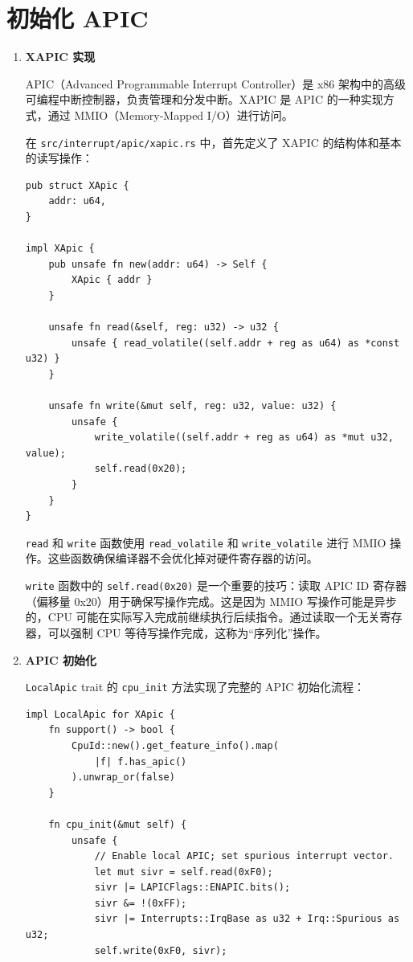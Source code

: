 \documentclass{SYSUReport}
\begin{document}
\section{初始化 APIC}

\begin{enumerate}[label={\chinese*、},labelsep=0pt, start=4]

    \item \textbf{XAPIC 实现}

    APIC（Advanced Programmable Interrupt Controller）是 x86 架构中的高级可编程中断控制器，负责管理和分发中断。XAPIC 是 APIC 的一种实现方式，通过 MMIO（Memory-Mapped I/O）进行访问。

    在 \texttt{src/interrupt/apic/xapic.rs} 中，首先定义了 XAPIC 的结构体和基本的读写操作：

    \begin{verbatim}
pub struct XApic {
    addr: u64,
}

impl XApic {
    pub unsafe fn new(addr: u64) -> Self {
        XApic { addr }
    }

    unsafe fn read(&self, reg: u32) -> u32 {
        unsafe { read_volatile((self.addr + reg as u64) as *const u32) }
    }

    unsafe fn write(&mut self, reg: u32, value: u32) {
        unsafe {
            write_volatile((self.addr + reg as u64) as *mut u32, value);
            self.read(0x20);
        }
    }
}
    \end{verbatim}

    \texttt{read} 和 \texttt{write} 函数使用 \texttt{read\_volatile} 和 \texttt{write\_volatile} 进行 MMIO 操作。这些函数确保编译器不会优化掉对硬件寄存器的访问。

    \texttt{write} 函数中的 \texttt{self.read(0x20)} 是一个重要的技巧：读取 APIC ID 寄存器（偏移量 0x20）用于确保写操作完成。这是因为 MMIO 写操作可能是异步的，CPU 可能在实际写入完成前继续执行后续指令。通过读取一个无关寄存器，可以强制 CPU 等待写操作完成，这称为“序列化”操作。

    \item \textbf{APIC 初始化}

    \texttt{LocalApic} trait 的 \texttt{cpu\_init} 方法实现了完整的 APIC 初始化流程：

    \begin{verbatim}
impl LocalApic for XApic {
    fn support() -> bool {
        CpuId::new().get_feature_info().map(
            |f| f.has_apic()
        ).unwrap_or(false)
    }

    fn cpu_init(&mut self) {
        unsafe {
            // Enable local APIC; set spurious interrupt vector.
            let mut sivr = self.read(0xF0);
            sivr |= LAPICFlags::ENAPIC.bits();
            sivr &= !(0xFF);
            sivr |= Interrupts::IrqBase as u32 + Irq::Spurious as u32;
            self.write(0xF0, sivr);


\end{verbatim}
\end{enumerate}
\end{document}
